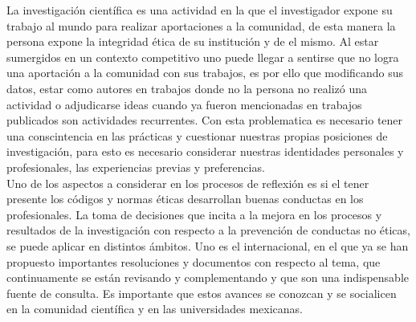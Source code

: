 La investigación científica es una actividad en la que el investigador expone su trabajo al mundo para
realizar aportaciones a la comunidad, de esta manera la persona expone la integridad ética de su institución
y de el mismo. Al estar sumergidos en un contexto competitivo uno puede llegar a sentirse que no logra una 
aportación a la comunidad con sus trabajos, es por ello que modificando sus datos, estar como autores en trabajos
donde no la persona no realizó una actividad o adjudicarse ideas cuando ya fueron mencionadas en trabajos publicados
son actividades recurrentes. Con esta problematica es necesario tener una conscintencia en las prácticas y 
cuestionar nuestras propias posiciones de investigación, para esto es necesario considerar nuestras identidades 
personales y profesionales, las experiencias previas y preferencias.\\
Uno de los aspectos a considerar en los procesos de reflexión es si el tener presente los códigos y normas éticas
desarrollan buenas conductas en los profesionales. La toma de decisiones que incita a la mejora en los procesos
y resultados de la investigación con respecto a la prevención de conductas no éticas, se puede aplicar en distintos
ámbitos. Uno es el internacional, en el que ya se han propuesto importantes resoluciones y documentos con respecto
al tema, que continuamente se están revisando y complementando y que son una indispensable fuente de consulta.
Es importante que estos avances se conozcan y se socialicen en la comunidad científica y en las universidades mexicanas.